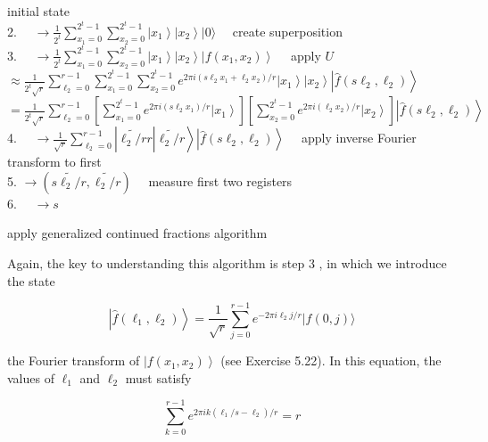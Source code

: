 initial state\\
2. $\quad \rightarrow \frac{1}{2^{t}} \sum_{x_{1}=0}^{2^{t}-1} \sum_{x_{2}=0}^{2^{t}-1}\left|x_{1}\right\rangle\left|x_{2}\right\rangle|0\rangle \quad$ create superposition\\
3. $\quad \rightarrow \frac{1}{2^{t}} \sum_{x_{1}=0}^{2^{t}-1} \sum_{x_{2}=0}^{2^{t}-1}\left|x_{1}\right\rangle\left|x_{2}\right\rangle\left|f\left(x_{1}, x_{2}\right)\right\rangle \quad$ apply $U$ $\approx \frac{1}{2^{t} \sqrt{r}} \sum_{\ell_{2}=0}^{r-1} \sum_{x_{1}=0}^{2^{t}-1} \sum_{x_{2}=0}^{2^{t}-1} e^{2 \pi i\left(s \ell_{2} x_{1}+\ell_{2} x_{2}\right) / r}\left|x_{1}\right\rangle\left|x_{2}\right\rangle\left|\hat{f}\left(s \ell_{2}, \ell_{2}\right)\right\rangle$ $=\frac{1}{2^{t} \sqrt{r}} \sum_{\ell_{2}=0}^{r-1}\left[\sum_{x_{1}=0}^{2^{t}-1} e^{2 \pi i\left(s \ell_{2} x_{1}\right) / r}\left|x_{1}\right\rangle\right]\left[\sum_{x_{2}=0}^{2^{t}-1} e^{2 \pi i\left(\ell_{2} x_{2}\right) / r}\left|x_{2}\right\rangle\right]\left|\hat{f}\left(s \ell_{2}, \ell_{2}\right)\right\rangle$\\
4. $\left.\quad \rightarrow \frac{1}{\sqrt{r}} \sum_{\ell_{2}=0}^{r-1}\left|\widetilde{\ell_{2} / r} r\right| \widetilde{\ell_{2} / r}\right\rangle\left|\hat{f}\left(s \ell_{2}, \ell_{2}\right)\right\rangle \quad$ apply inverse Fourier transform to first\\
5. $\rightarrow\left(\widetilde{s \ell_{2} / r}, \widetilde{\ell_{2} / r}\right) \quad$ measure first two registers\\
6. $\quad \rightarrow s$

apply generalized continued fractions algorithm

Again, the key to understanding this algorithm is step 3 , in which we introduce the state

\begin{equation}
    \left|\hat{f}\left(\ell_{1}, \ell_{2}\right)\right\rangle=\frac{1}{\sqrt{r}} \sum_{j=0}^{r-1} e^{-2 \pi i \ell_{2} j / r}|f(0, j)\rangle \tag{5.70}
\end{equation}

the Fourier transform of $\left|f\left(x_{1}, x_{2}\right)\right\rangle$ (see Exercise 5.22). In this equation, the values of $\ell_{1}$ and $\ell_{2}$ must satisfy

\begin{equation}
    \sum_{k=0}^{r-1} e^{2 \pi i k\left(\ell_{1} / s-\ell_{2}\right) / r}=r \tag{5.71}
\end{equation}

